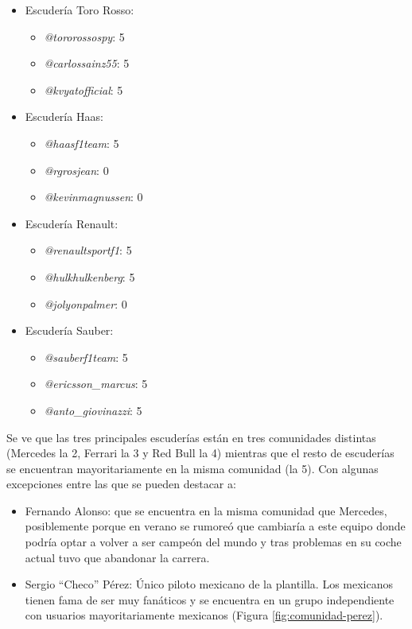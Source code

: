 \begin{itemize}
	\item Escudería Toro Rosso:
	\begin{itemize}
		\item \textit{@tororossospy}: 5
		\item \textit{@carlossainz55}: 5
		\item \textit{@kvyatofficial}: 5
	\end{itemize}

	\item Escudería Haas:
	\begin{itemize}
		\item \textit{@haasf1team}: 5
		\item \textit{@rgrosjean}: 0
		\item \textit{@kevinmagnussen}: 0
	\end{itemize}

	\item Escudería Renault:
	\begin{itemize}
		\item \textit{@renaultsportf1}: 5
		\item \textit{@hulkhulkenberg}: 5
		\item \textit{@jolyonpalmer}: 0
	\end{itemize}

	\item Escudería Sauber:
	\begin{itemize}
		\item \textit{@sauberf1team}: 5
		\item \textit{@ericsson\_marcus}: 5
		\item \textit{@anto\_giovinazzi}: 5
	\end{itemize}
\end{itemize} 

Se ve que las tres principales escuderías están en tres comunidades distintas (Mercedes la 2, Ferrari la 3 y Red Bull la 4) mientras que el resto de escuderías se encuentran mayoritariamente en la misma comunidad (la 5). Con algunas excepciones entre las que se pueden destacar a:

\begin{itemize}
	\item Fernando Alonso: que se encuentra en la misma comunidad que Mercedes, posiblemente porque en verano se rumoreó que cambiaría a este equipo donde podría optar a volver a ser campeón del mundo y tras problemas en su coche actual tuvo que abandonar la carrera.
	\item Sergio ``Checo'' Pérez: Único piloto mexicano de la plantilla. Los mexicanos tienen fama de ser muy fanáticos y se encuentra en un grupo independiente con usuarios mayoritariamente mexicanos (Figura \ref{fig:comunidad-perez}).
\end{itemize}
 
